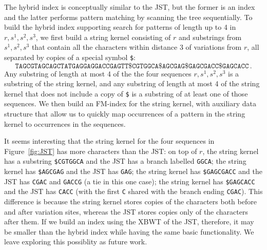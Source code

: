 The hybrid index is conceptually similar to the JST, but the former is an index and the latter performs pattern matching by scanning the tree sequentially.  To build the hybrid index supporting search for patterns of length up to 4 in $r, s^1, s^2, s^3$, we first build a string kernel consisting of $r$ and substrings from $s^1, s^2, s^3$ that contain all the characters within distance 3 of variations from $r$, all separated by copies of a special symbol {\tt \$}:
\[\mathtt{TAGCGTAGCAGCTATGAGGAGGACCGAGTT\$CGTGGCA\$AGCGAG\$GAGCGACC\$GAGCACC}\,.\]
Any substring of length at most 4 of the the four sequences $r, s^1, s^2, s^3$ is a substring of the string kernel, and any substring of length at most 4 of the string kernel that does not include a copy of {\tt \$} is a substring of at least one of those sequences.  We then build an FM-index for the string kernel, with auxiliary data structure that allow us to quickly map occurrences of a pattern in the string kernel to occurrences in the sequences. 

It seems interesting that the string kernel for the four sequences in Figure~\ref{fig:JST} has more characters than the JST: on top of $r$, the string kernel has a substring {\tt \$CGTGGCA} and the JST has a branch labelled {\tt GGCA}; the string kernel has {\tt \$AGCGAG} and the JST has {\tt GAG}; the string kernel has {\tt \$GAGCGACC} and the JST has {\tt CGAC} and {\tt GACCG} (a tie in this one case); the string kernel has {\tt \$GAGCACC} and the JST has {\tt CACC} (with the first {\tt C} shared with the branch ending {\tt CGAC}).  This difference is because the string kernel stores copies of the characters both before and after variation sites, whereas the JST stores copies only of the characters after them.  If we build an index using the XBWT of the JST, therefore, it may be smaller than the hybrid index while having the same basic functionality.  We leave exploring this possiblity as future work.